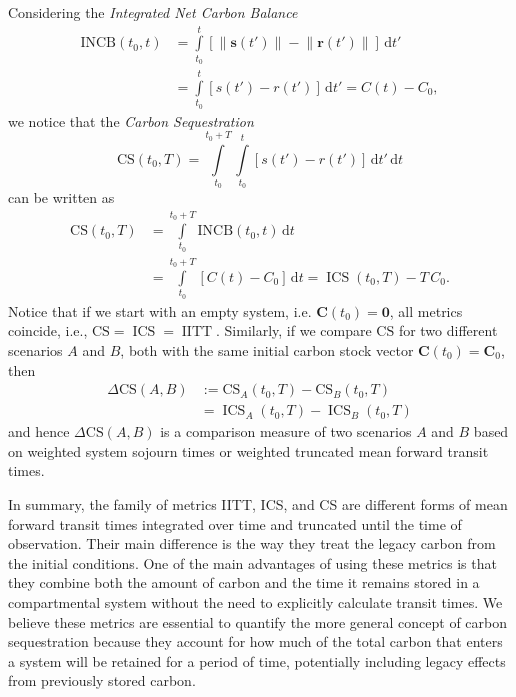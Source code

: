 \documentclass[ProofPDF]{./Styles/Jnls-Template-V3}
\newcommand{\CS}{\mathrm{CS}}
\newcommand{\INCB}{\mathrm{INCB}}
\newcommand{\IITT}{\operatorname{IITT}}
\newcommand{\ICS}{\operatorname{ICS}}
\newcommand{\intl}{\int\limits}
\newcommand{\dd}[1]{\,\mathrm{d}#1}
\renewcommand{\vec}[1]{\mathbf{#1}}
\newcommand{\vnorm}[1]{\left\|#1\right\|}
\begin{document}
Considering the \emph{Integrated Net Carbon Balance}
\begin{equation}
    \begin{aligned}
        \INCB(t_0,t) &= \intl_{t_0}^{t}\left[\vnorm{\vec{s}(t')}-\vnorm{\vec{r}(t')}\right]\dd{t'} \\
        &= \intl_{t_0}^t \left[s(t')-r(t')\right]\dd{t'} = C(t)-C_0,
    \end{aligned}
\end{equation}
we notice that the \emph{Carbon Sequestration}
\begin{equation}
    \CS(t_0,T) = \intl_{t_0}^{t_0+T} \intl_{t_0}^t \left[s(t')-r(t')\right]\dd{t'}\dd{t}
\end{equation}
can be written as
\begin{equation}
    \begin{aligned}
        \CS(t_0,T)& = \intl_{t_0}^{t_0+T} \INCB(t_0,t)\dd{t}\\ 
        &= \intl_{t_0}^{t_0+T} \left[C(t) - C_0\right]\dd{t} = \ICS(t_0,T) - T\,C_0.
     \end{aligned}
\end{equation}
Notice that if we start with an empty system, i.e. $\vec{C}(t_0) = \vec{0}$, all metrics coincide, i.e.,  $\CS = \ICS = \IITT$. 
Similarly, if we compare $\CS$ for two different scenarios $A$ and $B$, both with the same initial carbon stock vector $\vec{C}(t_0)=\vec{C}_0$, then
\begin{equation}
    \label{eqn:Delta_CS}
    \begin{aligned}
        \Delta\CS(A,B)& := \CS_A(t_0,T) - \CS_B(t_0,T)\\ 
        &= \ICS_A(t_0,T) - \ICS_B(t_0,T)
    \end{aligned}
\end{equation}
and hence $\Delta\CS(A,B)$ is a comparison measure of two scenarios $A$ and $B$ based on weighted system sojourn times or weighted truncated mean forward transit times.

In summary, the family of metrics IITT, ICS, and CS are different forms of mean forward transit times integrated over time and truncated until the time of observation. Their main difference is the way they treat the legacy carbon from the initial conditions. One of the main advantages of using these metrics is that they combine both the amount of carbon and the time it remains stored in a compartmental system without the need to explicitly calculate transit times. We believe these metrics are essential to quantify the more general concept of carbon sequestration because they account for how much of the total carbon that enters a system will be retained for a period of time, potentially including legacy effects from previously stored carbon. 
\end{document}
